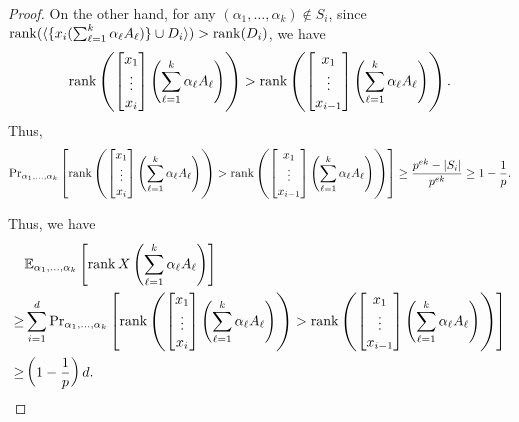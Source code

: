 \begin{proof}
On the other hand, for any $(\alpha_1, \dots, \alpha_k) \notin S_i$, 
since $\rank(\langle \{x_i (\sum_{\ell = 1}^k \alpha_\ell A_\ell)\} \cup D_i\rangle) > \rank(D_i)$, 
we have 
\[\rank\left(\begin{bmatrix} x_1 \\ \vdots \\ x_i \end{bmatrix}\left(\sum_{\ell=1}^k \alpha_\ell A_\ell\right)\right) > \rank\left(\begin{bmatrix} x_1 \\ \vdots \\ x_{i-1} \end{bmatrix}\left(\sum_{\ell=1}^k \alpha_\ell A_\ell\right)\right).\]
Thus,
\[\mathrm{Pr}_{\alpha_1, \dots, \alpha_k}\left[\rank\left(\begin{bmatrix} x_1 \\ \vdots \\ x_i \end{bmatrix}\left(\sum_{\ell=1}^k \alpha_\ell A_\ell\right)\right) > \rank\left(\begin{bmatrix} x_1 \\ \vdots \\ x_{i-1} \end{bmatrix}\left(\sum_{\ell=1}^k \alpha_\ell A_\ell\right)\right)\right] \geq \frac{p^{ek} - |S_i|}{p^{ek}} \geq 1 - \frac{1}{p}.\]

Thus, we have \begin{align*}& \mathbb{E}_{\alpha_1, \dots, \alpha_k}\left[\rank {X \left(\sum_{\ell=1}^k \alpha_\ell A_\ell\right) }\right]  \\ \geq & 
\sum_{i=1}^d \mathrm{Pr}_{\alpha_1, \dots, \alpha_k}\left[\rank\left(\begin{bmatrix} x_1 \\ \vdots \\ x_i \end{bmatrix}\left(\sum_{\ell=1}^k \alpha_\ell A_\ell\right)\right) > \rank\left(\begin{bmatrix} x_1 \\ \vdots \\ x_{i-1} \end{bmatrix}\left(\sum_{\ell=1}^k \alpha_\ell A_\ell\right)\right)\right]  \\
\geq & \left(1 - \frac{1}{p}\right)d.\qedhere\end{align*}

\end{proof}
